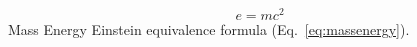 \documentclass[twoside,a4paper,10pt]{article}
\begin{document}
\begin{equation}
e = mc^2
\label{eq:massenergy}
\end{equation}
Mass Energy Einstein equivalence formula (Eq.~\ref{eq:massenergy}).



\end{document}
